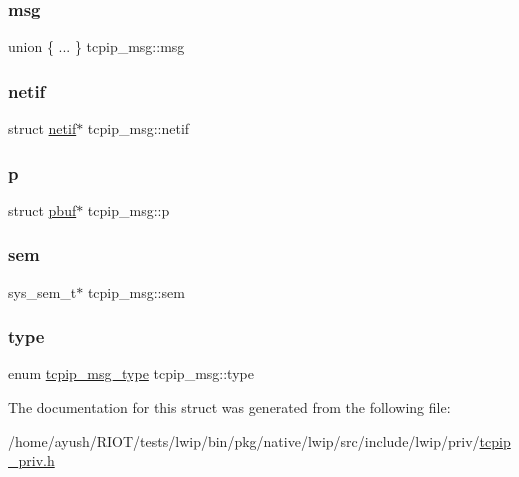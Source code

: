 \subsubsection{\texorpdfstring{msg}{msg}\hspace{0.1cm}{\footnotesize\ttfamily [3/3]}}
{\footnotesize\ttfamily union \{ ... \}   tcpip\+\_\+msg\+::msg}

\mbox{\label{structtcpip__msg_a6d19f55f8a96b18f2d6ab5bc9733f81b}} 
\subsubsection{\texorpdfstring{netif}{netif}}
{\footnotesize\ttfamily struct \hyperlink{structnetif}{netif}$\ast$ tcpip\+\_\+msg\+::netif}

\mbox{\label{structtcpip__msg_a9298bc5d6d92c5efd478dac92c09459b}} 
\subsubsection{\texorpdfstring{p}{p}}
{\footnotesize\ttfamily struct \hyperlink{structpbuf}{pbuf}$\ast$ tcpip\+\_\+msg\+::p}

\mbox{\label{structtcpip__msg_a68b745804255e3b227ec2f5ef0f8e136}} 
\subsubsection{\texorpdfstring{sem}{sem}}
{\footnotesize\ttfamily sys\+\_\+sem\+\_\+t$\ast$ tcpip\+\_\+msg\+::sem}

\mbox{\label{structtcpip__msg_a5b992b509c516199c800c913993574c1}} 
\subsubsection{\texorpdfstring{type}{type}}
{\footnotesize\ttfamily enum \hyperlink{native_2lwip_2src_2include_2lwip_2priv_2tcpip__priv_8h_a1e0cb5032a61055e3f4a3426ed548937}{tcpip\+\_\+msg\+\_\+type} tcpip\+\_\+msg\+::type}



The documentation for this struct was generated from the following file\+:\begin{DoxyCompactItemize}
\item 
/home/ayush/\+R\+I\+O\+T/tests/lwip/bin/pkg/native/lwip/src/include/lwip/priv/\hyperlink{native_2lwip_2src_2include_2lwip_2priv_2tcpip__priv_8h}{tcpip\+\_\+priv.\+h}\end{DoxyCompactItemize}

